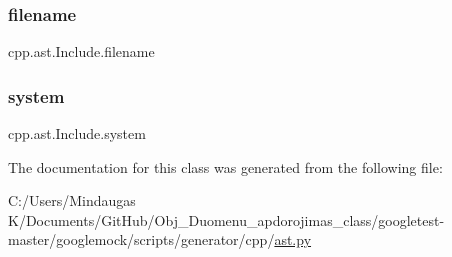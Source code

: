 \subsubsection{\texorpdfstring{filename}{filename}}
{\footnotesize\ttfamily cpp.\+ast.\+Include.\+filename}

\mbox{\label{classcpp_1_1ast_1_1_include_a2e8e535b1af7d9b0ff94d0ae9f86e5c5}} 
\subsubsection{\texorpdfstring{system}{system}}
{\footnotesize\ttfamily cpp.\+ast.\+Include.\+system}



The documentation for this class was generated from the following file\+:\begin{DoxyCompactItemize}
\item 
C\+:/\+Users/\+Mindaugas K/\+Documents/\+Git\+Hub/\+Obj\+\_\+\+Duomenu\+\_\+apdorojimas\+\_\+class/googletest-\/master/googlemock/scripts/generator/cpp/\mbox{\hyperlink{googletest-master_2googlemock_2scripts_2generator_2cpp_2ast_8py}{ast.\+py}}\end{DoxyCompactItemize}
